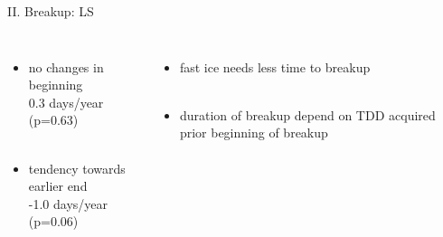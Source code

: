 \documentclass[8pt]{beamer}
\begin{document}
\begin{frame}[fragile]{II. Breakup: LS}
	\begin{columns}
		\begin{itemize}
			\item{no changes in beginning \\ 0.3 days/year (p=0.63)\\}~\\
			\item{tendency towards earlier end\\ -1.0 days/year (p=0.06)}
		\end{itemize}
		\begin{itemize}
			\item{fast ice needs less time to breakup\\}~\\
			\item{duration of breakup depend on TDD acquired prior beginning of breakup }
		\end{itemize}
	\end{columns}
\end{frame}



\end{document}
